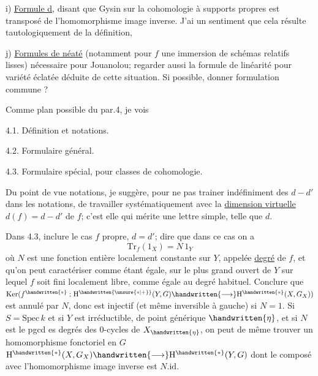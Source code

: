  i) \uline{Formule d}, disant que Gysin  sur la cohomologie à supports propres est transposé de l'homomorphisme image inverse. J'ai un sentiment que cela résulte tautologiquement de la définition, 

 j) \uline{Formules de néaté} (notamment pour $f$ une immersion de schémas relatifs lisses)\handwritten{,} nécessaire pour Jouanolou; regarder aussi la formule de linéarité pour variété éclatée déduite de cette situation. Si possible, donner formulation commune ?

Comme plan possible du par.4, je vois

4.1. Définition et notations.

4.2. Formulaire général.

4.3. Formulaire spécial, pour classes de cohomologie.

Du point de vue notations, je suggère, pour ne pas trainer indéfiniment des $d-d'$ dans les notations, de travailler systématiquement avec la \uline{dimension virtuelle} $d(f)=d-d'$ de $f$; c'est elle qui mérite une lettre simple, telle que $d$.

Dans 4.3, inclure le cas $f$ propre, $d=d'$; dire que dans ce  cas on a
\[
\mathrm{Tr}_f(1_X)=N\,1_Y
\]
où $N$ est une fonction entière localement constante sur $Y$, appelée \uline{degré} de $f$, et qu'on peut caractériser comme étant égale, sur  le plus grand ouvert de $Y$ sur lequel $f$ soit fini localement libre, comme égale au degré habituel. Conclure que $\mathrm{Ker}(f^{\handwritten{*}}:\mathrm{H}^{\handwritten{\unsure{*|+}}}(Y,G)\handwritten{\longrightarrow}\mathrm{H}^{\handwritten{*}}(X,G_X))$ est annulé par $N$, donc est injectif (et même inversible à gauche) si $N=1$. \handwritten{[}Si $S=\mathrm{Spec}\,k$ et si $Y$ est irréductible, de point générique $\handwritten{\eta}$, et si $N$ est le pgcd es degrés des $0$-cycles de $X_{\handwritten{\eta}}$\inserted{\handwritten{$\neq\unsure{\phi|\varnothing}$}}, on peut de même trouver un homomorphisme\handwritten{,} fonctoriel en $G$\handwritten{\unsure{$\leftarrow$}}\handwritten{,} $\mathrm{H}^{\handwritten{*}}(X,G_X)\handwritten{\longrightarrow}\mathrm{H}^{\handwritten{*}}(Y,G)$ dont le composé avec l'homomorphisme image inverse est $N.\mathrm{id}$.\handwritten{]}
